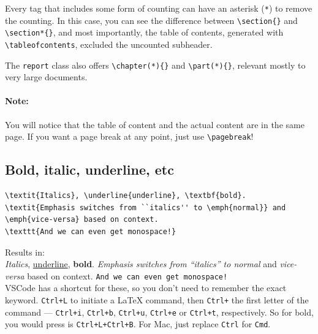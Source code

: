Every tag that includes some form of counting can have an asterisk (\verb|*|) to remove the counting.
In this case, you can see the difference between \verb|\section{}| and \verb|\section*{}|, and most importantly, the table of contents, generated with \verb|\tableofcontents|, excluded the uncounted subheader.

The \verb|report| class also offers \verb|\chapter(*){}| and \verb|\part(*){}|, relevant mostly to very large documents.

\paragraph{Note:} You will notice that the table of content and the actual content are in the same page. If you want a page break at any point, just use \verb|\pagebreak|!

\subsection{Bold, italic, underline, etc}

\begin{lstlisting}
\textit{Italics}, \underline{underline}, \textbf{bold}.
\textit{Emphasis switches from ``italics'' to \emph{normal}} and \emph{vice-versa} based on context.
\texttt{And we can even get monospace!}
\end{lstlisting}
Results in: \\
\textit{Italics}, \underline{underline}, \textbf{bold}.
\textit{Emphasis switches from ``italics'' to \emph{normal}} and \emph{vice-versa} based on context.
\texttt{And we can even get monospace!}\\

VSCode has a shortcut for these, so you don't need to remember the exact keyword. \verb|Ctrl+L| to initiate a LaTeX command, then \verb|Ctrl+| the first letter of the command --- \verb|Ctrl+i|, \verb|Ctrl+b|, \verb|Ctrl+u|, \verb|Ctrl+e| or \verb|Ctrl+t|, respectively.
So for bold, you would press is \verb|Ctrl+L+Ctrl+B|.
For Mac, just replace \verb|Ctrl| for \verb|Cmd|.


